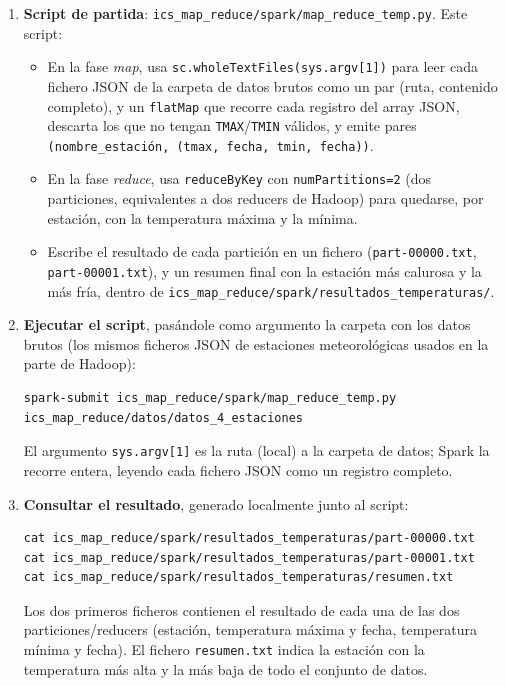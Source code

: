 \documentclass[11pt,a4paper]{article}
\begin{document}
\begin{enumerate}

\item \textbf{Script de partida}: \texttt{ics\_map\_reduce/spark/map\_reduce\_temp.py}. Este script:
\begin{itemize}
    \item En la fase \emph{map}, usa \texttt{sc.wholeTextFiles(sys.argv[1])} para leer cada fichero JSON de la carpeta de datos brutos como un par (ruta, contenido completo), y un \texttt{flatMap} que recorre cada registro del array JSON, descarta los que no tengan \texttt{TMAX}/\texttt{TMIN} válidos, y emite pares \texttt{(nombre\_estación, (tmax, fecha, tmin, fecha))}.
    \item En la fase \emph{reduce}, usa \texttt{reduceByKey} con \texttt{numPartitions=2} (dos particiones, equivalentes a dos reducers de Hadoop) para quedarse, por estación, con la temperatura máxima y la mínima.
    \item Escribe el resultado de cada partición en un fichero (\texttt{part-00000.txt}, \texttt{part-00001.txt}), y un resumen final con la estación más calurosa y la más fría, dentro de \texttt{ics\_map\_reduce/\allowbreak spark/\allowbreak resultados\_temperaturas/}.
\end{itemize}

\item \textbf{Ejecutar el script}, pasándole como argumento la carpeta con los datos brutos (los mismos ficheros JSON de estaciones meteorológicas usados en la parte de Hadoop):
\begin{lstlisting}
spark-submit ics_map_reduce/spark/map_reduce_temp.py ics_map_reduce/datos/datos_4_estaciones
\end{lstlisting}
El argumento \texttt{sys.argv[1]} es la ruta (local) a la carpeta de datos; Spark la recorre entera, leyendo cada fichero JSON como un registro completo.

\item \textbf{Consultar el resultado}, generado localmente junto al script:
\begin{lstlisting}
cat ics_map_reduce/spark/resultados_temperaturas/part-00000.txt
cat ics_map_reduce/spark/resultados_temperaturas/part-00001.txt
cat ics_map_reduce/spark/resultados_temperaturas/resumen.txt
\end{lstlisting}
Los dos primeros ficheros contienen el resultado de cada una de las dos particiones/reducers (estación, temperatura máxima y fecha, temperatura mínima y fecha). El fichero \texttt{resumen.txt} indica la estación con la temperatura más alta y la más baja de todo el conjunto de datos.

\end{enumerate}
\end{document}
